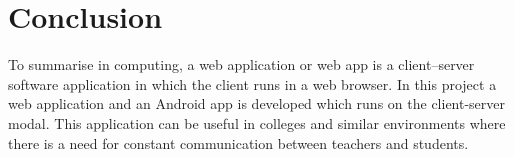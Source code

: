 \section{Conclusion}
To summarise in computing, a web application or web app is a client–server software application in which
the client runs in a web browser. In this project a web application and an Android app is developed which
runs on the client-server modal. This application can be useful in colleges and similar environments where
there is a need for constant communication between teachers and students.\\
